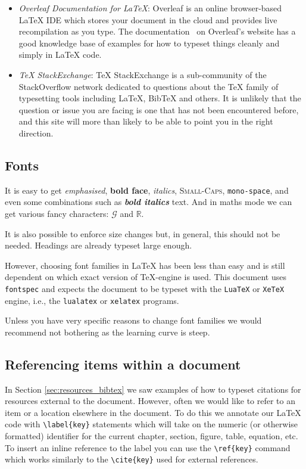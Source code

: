 \documentclass[12pt]{article}
\theoremstyle{plain}
\theoremstyle{definition}
\begin{document}
\begin{itemize}
\item \emph{Overleaf Documentation for LaTeX}: Overleaf
  \cite{overleaf} is an online browser-based LaTeX IDE which stores
  your document in the cloud and provides live recompilation as you
  type. The documentation~\cite{overleafdocs} on Overleaf's website
  has a good knowledge base of examples for how to typeset things
  cleanly and simply in LaTeX code.
\item \emph{TeX StackExchange}: TeX StackExchange
  \cite{texstackexchange} is a sub-community of the StackOverflow
  network dedicated to questions about the TeX family of typesetting
  tools including LaTeX, BibTeX and others. It is unlikely that the
  question or issue you are facing is one that has not been
  encountered before, and this site will more than likely to be able
  to point you in the right direction.
\end{itemize}

\subsection{Fonts}

It is easy to get \emph{emphasised}, \textbf{bold face},
\textit{italics}, \textsc{Small-Caps}, \texttt{mono-space}, and even
some combinations such as \textbf{\textit{bold italics}} text. And in
maths mode we can get various fancy characters: \(\mathcal{G}\) and
\(\mathbb{R}\).

It is also possible to enforce size changes but, in general, this
should not be needed. Headings are already typeset large enough.

However, choosing font families in LaTeX has been less than easy and
is still dependent on which exact version of TeX-engine is used. This
document uses \verb|fontspec| and expects the document to be typeset
with the \verb|LuaTeX| or \verb|XeTeX| engine, i.e., the
\verb|lualatex| or \verb|xelatex| programs.

Unless you have very specific reasons to change font families we would
recommend not bothering as the learning curve is steep.

\subsection{Referencing items within a document}

In Section \ref{sec:resources_bibtex} we saw examples of how to
typeset citations for resources external to the document. However,
often we would like to refer to an item or a location elsewhere in the
document. To do this we annotate our LaTeX code with
\verb|\label{key}| statements which will take on the numeric (or
otherwise formatted) identifier for the current chapter, section,
figure, table, equation, etc. To insert an inline reference to the
label you can use the \verb|\ref{key}| command which works
similarly to the \verb|\cite{key}| used for external
references.
\end{document}
